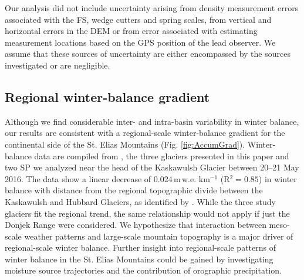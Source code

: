\documentclass[twocolumn, letterpaper]{igs}
\begin{document}
Our analysis did not include uncertainty arising from density measurement errors associated with the FS, wedge cutters and spring scales, from vertical and horizontal errors in the DEM or from error associated with estimating measurement locations based on the GPS position of the lead observer. We assume that these sources of uncertainty are either encompassed by the sources investigated or are negligible.


\subsection{Regional winter-balance gradient}

Although we find considerable inter- and intra-basin variability in winter balance, our results are consistent with a regional-scale winter-balance gradient for the continental side of the St. Elias Mountains (Fig. \ref{fig:AccumGrad}). Winter-balance data are compiled from \cite{Taylor1969}, the three glaciers presented in this paper and two SP we analyzed near the head of the Kaskawulsh Glacier between 20--21 May 2016. The data show a linear decrease of $0.024$\,m\,w.e. km$^{-1}$ (R$^2=0.85$) in winter balance with distance from the regional topographic divide between the Kaskawulsh and Hubbard Glaciers, as identified by \cite{Taylor1969}. While the three study glaciers fit the regional trend, the same relationship would not apply if just the Donjek Range were considered. We hypothesize that interaction between meso-scale weather patterns and large-scale mountain topography is a major driver of regional-scale winter balance. Further insight into regional-scale patterns of winter balance in the St. Elias Mountains could be gained by investigating moisture source trajectories and the contribution of orographic precipitation. 
\end{document}
